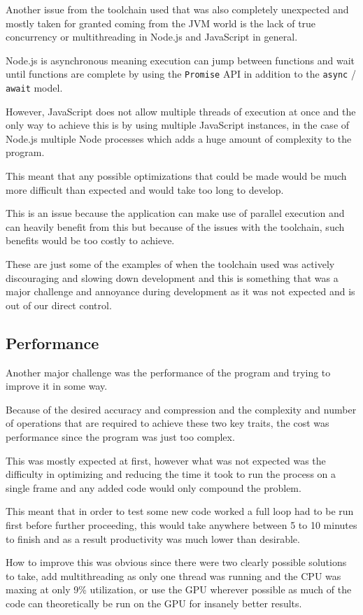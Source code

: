 \documentclass[12pt]{article}
\newcommand{\sentence}{} %
\newcommand{\code}[1]{\texttt{#1}}
\begin{document}
    \bigskip
    Another issue from the toolchain used that was also completely unexpected and mostly taken for granted coming
    from the JVM world is the lack of true concurrency or multithreading in Node.js and JavaScript in general.
    \sentence
    Node.js is asynchronous meaning execution can jump between functions and wait until functions are complete by
    using the \code{Promise} API in addition to the \code{async} / \code{await} model.
    \sentence
    However, JavaScript does not allow multiple threads of execution at once and the only way to achieve this is by
    using multiple JavaScript instances, in the case of Node.js multiple Node processes which adds a huge amount of
    complexity to the program.
    \sentence
    This meant that any possible optimizations that could be made would be much more difficult than expected and
    would take too long to develop.
    \sentence
    This is an issue because the application can make use of parallel execution and can heavily benefit from this but
    because of the issues with the toolchain, such benefits would be too costly to achieve.
    \sentence
    These are just some of the examples of when the toolchain used was actively discouraging and slowing down
    development and this is something that was a major challenge and annoyance during development as it was not
    expected and is out of our direct control.

    \subsection{Performance}\label{subsec:performance}

    \tab
    Another major challenge was the performance of the program and trying to improve it in some way.
    \sentence
    Because of the desired accuracy and compression and the complexity and number of operations that are required to
    achieve these two key traits, the cost was performance since the program was just too complex.
    \sentence
    This was mostly expected at first, however what was not expected was the difficulty in optimizing and reducing
    the time it took to run the process on a single frame and any added code would only compound the problem.
    \sentence
    This meant that in order to test some new code worked a full loop had to be run first before further proceeding,
    this would take anywhere between 5 to 10 minutes to finish and as a result productivity was much lower than
    desirable.
    \sentence
    How to improve this was obvious since there were two clearly possible solutions to take, add multithreading as
    only one thread was running and the CPU was maxing at only 9\% utilization, or use the GPU wherever possible as
    much of the code can theoretically be run on the GPU for insanely better results.
\end{document}
